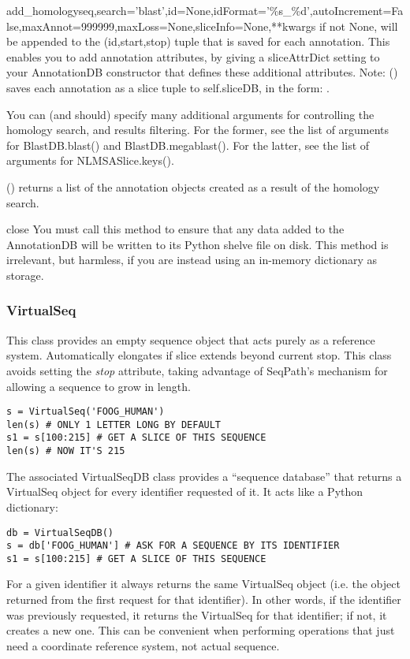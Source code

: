 \documentclass{howto}
\begin{document}
\begin{funcdesc}{add_homology}{seq,search='blast',id=None,idFormat='\%s_\%d',autoIncrement=False,maxAnnot=999999,maxLoss=None,sliceInfo=None,**kwargs}
   if not None, will be appended to the (id,start,stop)
  tuple that is saved for each annotation.  This enables you to add
  annotation attributes, by giving a sliceAttrDict setting to your AnnotationDB
  constructor that defines these additional attributes.  Note: ()
  saves each annotation as a slice tuple to self.sliceDB, in the form:
  .

  You can (and should) specify many additional arguments for controlling
  the homology search, and results filtering.  For the former, see the list
  of arguments for BlastDB.blast() and BlastDB.megablast().  For the latter,
  see the list of arguments for NLMSASlice.keys().

  () returns a list of the annotation objects 
  created as a result of the homology search.
\end{funcdesc}

\begin{funcdesc}{close}{}
  You must call this method to ensure that any data added to the AnnotationDB
  will be written to its Python shelve file on disk.
  This method is irrelevant, but harmless,
  if you are instead using an in-memory dictionary as storage.
\end{funcdesc}

\subsubsection{VirtualSeq}
This class provides an empty sequence object that
acts purely as a reference system.
Automatically elongates if slice extends beyond current stop.
This class avoids setting the {\em stop} attribute, taking advantage
of SeqPath's mechanism for allowing a sequence to grow in length.
\begin{verbatim}
s = VirtualSeq('FOOG_HUMAN')
len(s) # ONLY 1 LETTER LONG BY DEFAULT
s1 = s[100:215] # GET A SLICE OF THIS SEQUENCE
len(s) # NOW IT'S 215
\end{verbatim}

The associated VirtualSeqDB class provides a ``sequence database''
that returns a VirtualSeq object for every identifier requested of
it.  It acts like a Python dictionary:
\begin{verbatim}
db = VirtualSeqDB()
s = db['FOOG_HUMAN'] # ASK FOR A SEQUENCE BY ITS IDENTIFIER
s1 = s[100:215] # GET A SLICE OF THIS SEQUENCE
\end{verbatim}
For a given identifier it always returns the same VirtualSeq
object (i.e. the object returned from the first request for that identifier).
In other words, if the identifier was previously requested,
it returns the VirtualSeq for that identifier; if not, it 
creates a new one.
This can be convenient when performing operations that just
need a coordinate reference system, not actual sequence.
\end{document}
